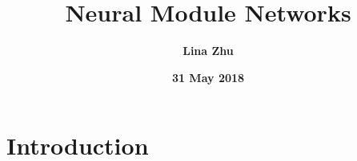 \documentclass[a4paper,18pt]{article}
\begin{document}
	
	\twocolumn
% 

%
 \title{\textbf{\bfseries \LARGE Neural Module Networks} }
\author{\textbf{Lina Zhu}}
\date{\textbf{31 May 2018}}
\maketitle
\section{Introduction}
\end{document}
